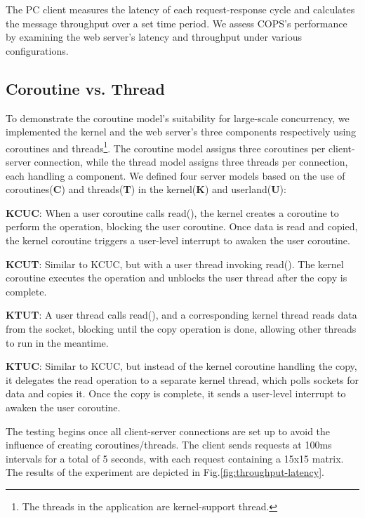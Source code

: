 \documentclass[conference]{IEEEtran}
\begin{document}
The PC client measures the latency of each request-response cycle and calculates the message throughput over a set time period. We assess COPS's performance by examining the web server's latency and throughput under various configurations.

\subsection{Coroutine vs. Thread}

To demonstrate the coroutine model's suitability for large-scale concurrency, we implemented the kernel and the web server's three components respectively using coroutines and threads\footnote{The threads in the application are kernel-support thread.}. The coroutine model assigns three coroutines per client-server connection, while the thread model assigns three threads per connection, each handling a component. We defined four server models based on the use of coroutines(\textbf{C}) and threads(\textbf{T}) in the kernel(\textbf{K}) and userland(\textbf{U}):

\textbf{KCUC}: When a user coroutine calls read(), the kernel creates a coroutine to perform the operation, blocking the user coroutine. Once data is read and copied, the kernel coroutine triggers a user-level interrupt to awaken the user coroutine.

\textbf{KCUT}: Similar to KCUC, but with a user thread invoking read(). The kernel coroutine executes the operation and unblocks the user thread after the copy is complete.

\textbf{KTUT}: A user thread calls read(), and a corresponding kernel thread reads data from the socket, blocking until the copy operation is done, allowing other threads to run in the meantime.
	
\textbf{KTUC}: Similar to KCUC, but instead of the kernel coroutine handling the copy, it delegates the read operation to a separate kernel thread, which polls sockets for data and copies it. Once the copy is complete, it sends a user-level interrupt to awaken the user coroutine.

The testing begins once all client-server connections are set up to avoid the influence of creating coroutines/threads. The client sends requests at 100ms intervals for a total of 5 seconds, with each request containing a 15x15 matrix. The results of the experiment are depicted in Fig.\ref{fig:throughput-latency}.
\end{document}
